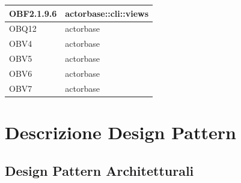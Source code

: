 \documentclass{scalatekids-article}
\begin{document}
\begin{longtable}[H]{|p{3.5cm}|p{7.5cm}|}
\hline
OBF2.1.9.6 & \multiLineCell[t]{actorbase::cli::views\\}\\
\hline
OBQ12 & \multiLineCell[t]{actorbase\\}\\
\hline
OBV4 & \multiLineCell[t]{actorbase\\}\\
\hline
OBV5 & \multiLineCell[t]{actorbase\\}\\
\hline
OBV6 & \multiLineCell[t]{actorbase\\}\\
\hline
OBV7 & \multiLineCell[t]{actorbase\\}\\
\hline
\end{longtable}

\newpage
\appendix
\label{sec:appendice}

\section{Descrizione Design Pattern}

\subsection{Design Pattern Architetturali}
\end{document}
